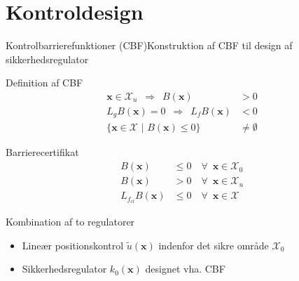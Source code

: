 \section{Kontroldesign}
\begin{frame}{Kontrolbarrierefunktioner (CBF)}{Konstruktion af CBF til design af sikkerhedsregulator}
	\vspace{5mm}
\begin{minipage}[b]{0.5\linewidth}
	\begin{block}{Definition af CBF}
		\vspace{-5mm}
		\begin{align*}
		\mathbf{x}\in\mathcal{X}_u \,\,\, \Rightarrow\,\,\, B(\mathbf{x})&>0\\
		L_gB(\mathbf{x})=0 \,\,\,\Rightarrow\,\,\, L_fB(\mathbf{x})&<0\\
		\{\mathbf{x}\in\mathcal{X}\,\,|\,\,B(\mathbf{x})\leq 0 \} &\neq \emptyset
		\end{align*}
	\end{block}
\end{minipage}
\hspace{4mm}
\begin{minipage}[b]{0.35\linewidth}
	\begin{block}{Barrierecertifikat}
		\vspace{-5mm}
		\begin{align*}
		B(\mathbf{x})&\leq 0 \quad \forall\,\,\,\mathbf{x}\in\mathcal{X}_0\\
		B(\mathbf{x})&> 0 \quad \forall\,\,\,\mathbf{x}\in\mathcal{X}_u\\
		L_{f_{cl}}B(\mathbf{x})&\leq 0 \quad \forall\,\,\,\mathbf{x}\in\mathcal{X}
		\end{align*}
	\end{block}
\end{minipage}
\vspace{2mm}
\begin{block}{Kombination af to regulatorer}
	\begin{itemize}
		\item Lineær positionskontrol $\tilde{u}(\mathbf{x})$ indenfor det sikre område $\mathcal{X}_0$
		\item Sikkerhedsregulator $k_0(\mathbf{x})$ designet vha. CBF %

\end{itemize}
\end{block}
\end{frame}

